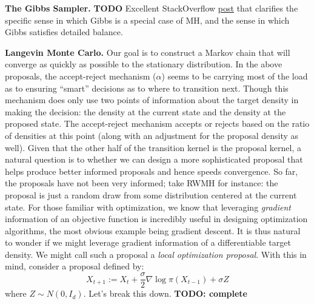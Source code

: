 \documentclass[12pt]{article}
\begin{document}
\bigskip

\textbf{The Gibbs Sampler.} \textbf{TODO} 
Excellent StackOverflow \href{https://stats.stackexchange.com/questions/118442/does-the-gibbs-sampling-algorithm-guarantee-detailed-balance#:~:text=You\%20tried\%20to\%20show\%20detailed,detailed\%20balance\%20is\%20not\%20satisfied.}{post} that clarifies the specific sense in which Gibbs is a special case of MH, and the sense in which Gibbs satisfies detailed balance. 



\bigskip

\textbf{Langevin Monte Carlo.} Our goal is to construct a Markov chain that will converge as quickly as possible to the stationary distribution. In the above proposals, the 
accept-reject mechanism ($\alpha$) seems to be carrying most of the load as to ensuring ``smart'' decisions as to where to transition next. Though this mechanism does 
only use two points of information about the target density in making the decision: the density at the current state and the density at the proposed state. The accept-reject 
mechanism accepts or rejects based on the ratio of densities at this point (along with an adjustment for the proposal density as well). Given that the other half of the 
transition kernel is the proposal kernel, a natural question is to whether we can design a more sophisticated proposal that helps produce better informed proposals and 
hence speeds convergence. So far, the proposals have not been very informed; take RWMH for instance: the proposal is just a random draw from some distribution 
centered at the current state. For those familiar with optimization, we know that leveraging \textit{gradient} information of an objective function is incredibly 
useful in designing optimization algorithms, the most obvious example being gradient descent. It is thus natural to wonder if we might leverage gradient information 
of a differentiable target density. We might call such a proposal a \textit{local optimization proposal}. With this in mind, consider a proposal defined by: 
\[X_{t + 1} := X_{t} + \frac{\sigma}{2} \nabla \log \pi(X_{t - 1}) + \sigma Z\]
where $Z \sim N(0, I_d)$. Let's break this down. \textbf{TODO: complete}
\end{document}
